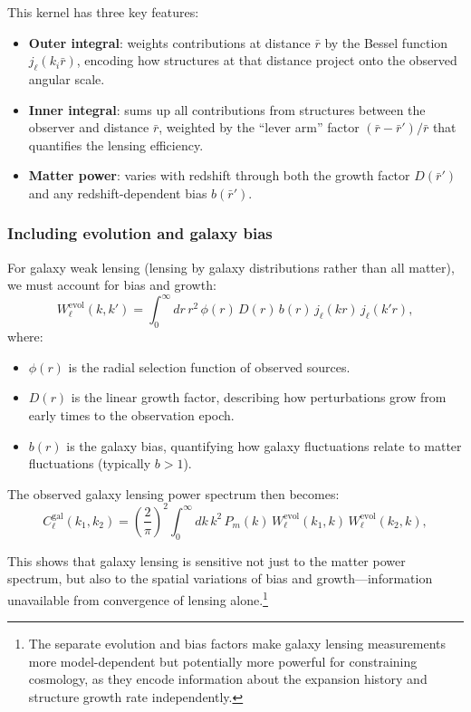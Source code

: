 This kernel has three key features:
\begin{itemize}
\item \textbf{Outer integral}: weights contributions at distance $\bar{r}$ by the Bessel function $j_\ell(k_i \bar{r})$, encoding how
structures at that distance project onto the observed angular scale.
\item \textbf{Inner integral}: sums up all contributions from structures between the observer and distance $\bar{r}$, weighted by
the ``lever arm'' factor $(\bar{r}-\bar{r}')/\bar{r}$ that quantifies the lensing efficiency.
\item \textbf{Matter power}: varies with redshift through both the growth factor $D(\bar{r}')$ and any redshift-dependent bias $b(\bar{r}')$.
\end{itemize}

\subsubsection{Including evolution and galaxy bias}

For galaxy weak lensing (lensing by galaxy distributions rather than all matter), we must account for bias and growth:
\begin{equation}
W_\ell^{\text{evol}}(k, k') = \int_0^\infty dr \, r^2 \, \phi(r) \, D(r) \, b(r) \, j_\ell(kr) \, j_\ell(k'r),
\label{eq:window_with_bias_growth}
\end{equation}
where:
\begin{itemize}
\item $\phi(r)$ is the radial selection function of observed sources.
\item $D(r)$ is the linear growth factor, describing how perturbations grow from early times to the observation epoch.
\item $b(r)$ is the galaxy bias, quantifying how galaxy fluctuations relate to matter fluctuations (typically $b > 1$).
\end{itemize}

The observed galaxy lensing power spectrum then becomes:
\begin{equation}
C_\ell^{\text{gal}}(k_1, k_2) = \left(\frac{2}{\pi}\right)^2 \int_0^\infty dk \, k^2 \, P_m(k) \, 
W_\ell^{\text{evol}}(k_1, k) \, W_\ell^{\text{evol}}(k_2, k),
\label{eq:galaxy_lensing_power}
\end{equation}

This shows that galaxy lensing is sensitive not just to the matter power spectrum, but also to the spatial variations of
bias and growth—information unavailable from convergence of lensing alone.\footnote{The separate evolution and bias factors make
galaxy lensing measurements more model-dependent but potentially more powerful for constraining cosmology, as they encode
information about the expansion history and structure growth rate independently.}

